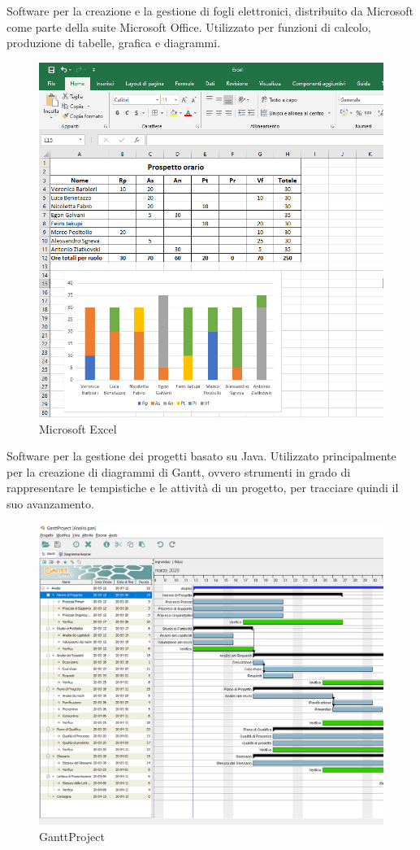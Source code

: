 		Software per la creazione e la gestione di fogli elettronici, distribuito da Microsoft come parte della suite Microsoft Office. Utilizzato per funzioni di calcolo, produzione di tabelle, grafica e diagrammi. \\
		\begin{figure}[h!]
			\centering
			\includegraphics[scale=0.62]{./res/img/excel.png}
			\caption{Microsoft Excel}
		\end{figure}
		\pagebreak
	    Software per la gestione dei progetti basato su Java. Utilizzato principalmente per la creazione di diagrammi di Gantt, ovvero strumenti in grado di rappresentare le tempistiche e le attività di un progetto, per tracciare quindi il suo avanzamento.
	    \begin{figure}[h!]
	    	\centering
	    	\includegraphics[scale=0.5]{./res/img/diagr_gantt.png}
	    	\caption{GanttProject}
	    \end{figure}
	    \pagebreak
		